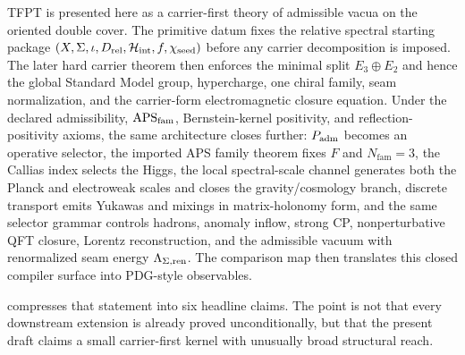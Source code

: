 TFPT is presented here as a carrier-first theory of admissible vacua on the oriented double cover. The primitive datum fixes the relative spectral starting package $(X,\Sigma,\iota,D_{\mathrm{rel}},\mathcal H_{\mathrm{int}},f,\chi_{\mathrm{seed}})$ before any carrier decomposition is imposed. The later hard carrier theorem then enforces the minimal split $E_3\oplus E_2$ and hence the global Standard Model group, hypercharge, one chiral family, seam normalization, and the carrier-form electromagnetic closure equation. Under the declared admissibility, $\mathrm{APS}_{\mathrm{fam}}$, Bernstein-kernel positivity, and reflection-positivity axioms, the same architecture closes further: $P_{\mathrm{adm}}$ becomes an operative selector, the imported APS family theorem fixes $F$ and $N_{\mathrm{fam}}=3$, the Callias index selects the Higgs, the local spectral-scale channel generates both the Planck and electroweak scales and closes the gravity/cosmology branch, discrete transport emits Yukawas and mixings in matrix-holonomy form, and the same selector grammar controls hadrons, anomaly inflow, strong CP, nonperturbative QFT closure, Lorentz reconstruction, and the admissible vacuum with renormalized seam energy $\Lambda_{\Sigma,\mathrm{ren}}$. The comparison map then translates this closed compiler surface into PDG-style observables.

 compresses that statement into six headline claims. The point is not that every downstream extension is already proved unconditionally, but that the present draft claims a small carrier-first kernel with unusually broad structural reach.

